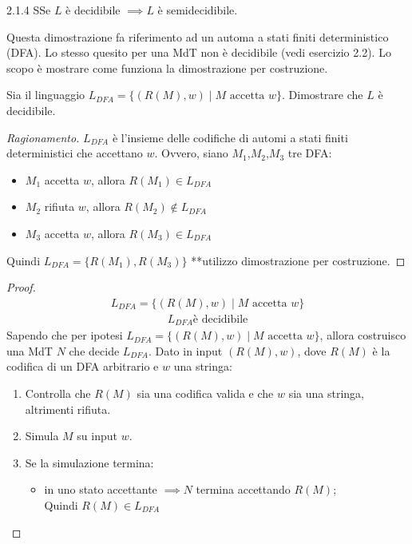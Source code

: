\documentclass{article}  %
\theoremstyle{definition}
\newenvironment{ragionamento}[1][]
  {\begin{proof}[Ragionamento#1]\renewcommand{\qedsymbol}{}\normalfont}
  {\end{proof}}
\begin{document}
\begin{theorem}{2.1.4}
	SSe $L$ è decidibile $\implies L$ è semidecidibile.
\end{theorem}
Questa dimostrazione fa riferimento ad un automa a stati finiti deterministico (DFA). Lo stesso quesito per una MdT non è decidibile (vedi esercizio 2.2).
Lo scopo è mostrare come funziona la dimostrazione per costruzione.
\begin{esercizio}[Esercizio 1.1]
	\footnotesize %
	Sia il linguaggio $L_{DFA} = \{(R(M), w) \mid M \text{ accetta } w\}$. Dimostrare che $L$ è decidibile.
	\begin{ragionamento}
		$L_{DFA}$ è l'insieme delle codifiche di automi a stati finiti deterministici che accettano $w$. Ovvero, siano $M_1$,$M_2$,$M_3$ tre DFA:
		\begin{itemize}
			\item $M_1$ accetta $w$, allora $R(M_1) \in L_{DFA}$
			\item $M_2$ rifiuta $w$, allora $R(M_2) \notin L_{DFA}$
			\item $M_3$ accetta $w$, allora $R(M_3) \in L_{DFA}$
		\end{itemize}
		Quindi \(L_{DFA}=\{R(M_1),R(M_3)\}\) \newline
		**utilizzo dimostrazione per costruzione.
	\end{ragionamento}
	\begin{proof}
		\begin{align*}
			L_{DFA} = \{(R(M), w) \mid M \text{ accetta } w\} \tag*{(ipotesi)}
		\end{align*}
		\begin{align*}
			L_{DFA} \text{è decidibile} \tag*{(tesi)}
		\end{align*}
		Sapendo che per ipotesi $L_{DFA} = \{(R(M), w) \mid M \text{ accetta } w\}$, allora costruisco una MdT $N$ che decide $L_{DFA}$.
		Dato in input $(R(M),w)$, dove $R(M)$ è la codifica di un DFA arbitrario e $w$ una stringa:
		\begin{enumerate}
			\item Controlla che $R(M)$ sia una codifica valida e che $w$ sia una stringa, altrimenti rifiuta.
			\item Simula $M$ su input $w$.
			\item Se la simulazione termina:
			      \begin{itemize}
				      \item in uno stato accettante $\implies N$ termina accettando $R(M)$; \\ Quindi $R(M) \in L_{DFA}$

\end{itemize}
\end{enumerate}
\end{proof}
\end{esercizio}
\end{document}
